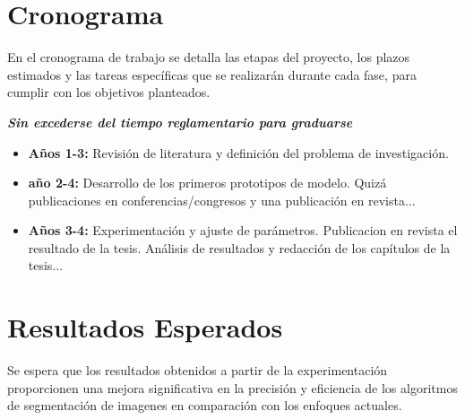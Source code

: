 \documentclass[a4paper,12pt]{article}
\begin{document}
		
	\newpage
	
	
	\section{Cronograma}
	En el cronograma de trabajo se detalla las etapas del proyecto, los plazos estimados y las tareas específicas que se realizarán durante cada fase, para cumplir con los objetivos planteados.
	
	\textbf{\emph{Sin excederse del tiempo reglamentario para graduarse}}
	

	\begin{itemize}
		\item \textbf{Años 1-3:} Revisión de literatura y definición del problema de investigación. 
		\item \textbf{año 2-4:} Desarrollo de los primeros prototipos de modelo. Quizá publicaciones en conferencias/congresos y una publicación en revista...
		\item \textbf{Años 3-4:} Experimentación y ajuste de parámetros. Publicacion en revista el resultado de la tesis.
		Análisis de resultados y redacción de los capítulos de la tesis...
	\end{itemize}
	
	\newpage
	
	\section{Resultados Esperados}
	Se espera que los resultados obtenidos a partir de la experimentación proporcionen una mejora significativa en la precisión y eficiencia de los algoritmos de segmentación de imagenes en comparación con los enfoques actuales.\cite{referencia2}
	
	\newpage
	
\section*{}

%			
%			

\newpage
	
\end{document}
